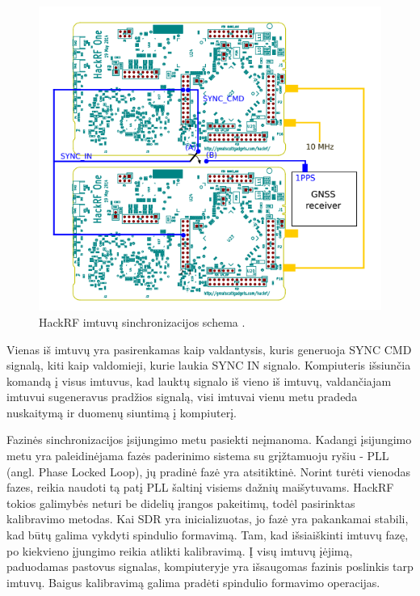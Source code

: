 \documentclass[main.tex]{subfiles}
\begin{document}
\begin{figure}[h]
    \begin{centering}
    \includegraphics[scale=0.8]{drawings/hackrf_sync}
    \par\end{centering}
    \protect\caption{\label{fig:hackrf_sync}HackRF imtuvų sinchronizacijos schema \cite{hackrf_sync}.}
\end{figure}

Vienas iš imtuvų yra pasirenkamas kaip valdantysis, kuris generuoja SYNC CMD signalą,
kiti kaip valdomieji, kurie laukia SYNC IN signalo. Kompiuteris
išsiunčia komandą į visus imtuvus, kad lauktų signalo iš vieno iš imtuvų,
valdančiajam imtuvui sugeneravus pradžios signalą, visi imtuvai vienu metu pradeda
nuskaitymą ir duomenų siuntimą į kompiuterį.

Fazinės sinchronizacijos įsijungimo metu pasiekti neįmanoma. Kadangi įsijungimo metu yra
paleidinėjama fazės paderinimo sistema su grįžtamuoju ryšiu - PLL (angl. Phase Locked Loop), jų pradinė fazė yra atsitiktinė.
Norint turėti vienodas fazes, reikia naudoti tą patį PLL šaltinį visiems
dažnių maišytuvams. HackRF tokios galimybės neturi be didelių įrangos pakeitimų, todėl pasirinktas
kalibravimo metodas.
Kai SDR yra inicializuotas, jo fazė yra pakankamai stabili, kad būtų galima
vykdyti spindulio formavimą.
Tam, kad išsiaiškinti imtuvų fazę, po kiekvieno įjungimo reikia atlikti kalibravimą.
Į visų imtuvų įėjimą, paduodamas pastovus signalas, kompiuteryje yra išsaugomas
fazinis poslinkis tarp imtuvų. Baigus kalibravimą galima pradėti spindulio
formavimo operacijas.
\end{document}

